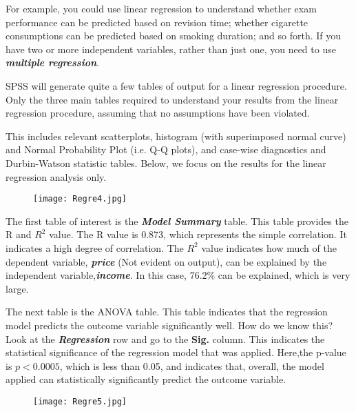 For example, you could use linear regression to understand whether exam performance can be predicted based on revision time; whether cigarette consumptions can be predicted based on smoking duration; and so forth. If you have two or more independent variables, rather than just one, you need to use \textbf{\textit{multiple regression}}.

SPSS will generate quite a few tables of output for a linear regression procedure. Only the three main tables required to understand your results from the linear regression procedure, assuming that no assumptions have been violated.

This includes relevant scatterplots, histogram (with superimposed normal curve) and Normal Probability Plot (i.e. Q-Q plots), and case-wise diagnostics and Durbin-Watson statistic tables. Below, we focus on the results for the linear regression analysis only.

\begin{figure}[h!]
\begin{centering}
  \texttt{[image: Regre4.jpg]}\\
\end{centering}
\end{figure}

The first table of interest is the \textbf{\textit{Model Summary}} table. This table provides the R and $R^2$ value. The R value is 0.873, which represents the simple correlation. It indicates a high degree of correlation. The $R^2$ value indicates how much of the dependent variable, \textbf{\textit{price}} (Not evident on output), can be explained by the independent variable,\textbf{\textit{income}}. In this case, 76.2\% can be explained, which is very large.


The next table is the ANOVA table. This table indicates that the regression model predicts the outcome variable significantly well. How do we know this? Look at the \textbf{\textit{Regression}} row and go to the \textbf{Sig.} column. This indicates the statistical significance of the regression model that was applied. Here,the p-value is  $p < 0.0005$, which is less than 0.05, and indicates that, overall, the model applied can statistically significantly predict the outcome variable.

\begin{figure}[h!]
\begin{centering}
  \texttt{[image: Regre5.jpg]}\\
\end{centering}
\end{figure}


